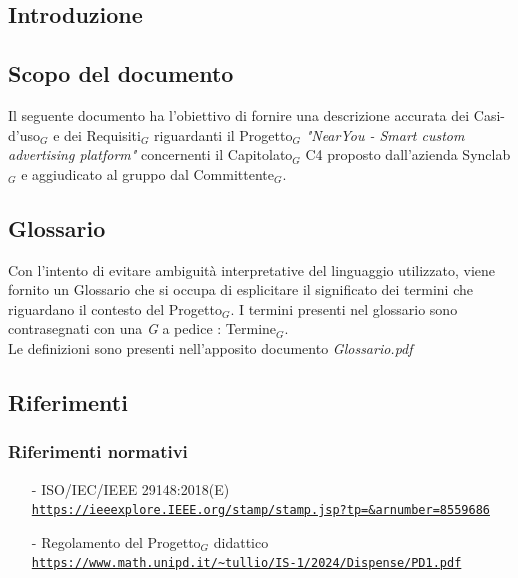 \documentclass[11pt]{article}
\begin{document}
\newpage
\tableofcontents
\newpage
\listoffigures
\newpage
\listoftables

\newpage
\begin{justify}

\section{Introduzione}
\label{sec:intro}

\subsection{Scopo del documento}

Il seguente documento ha l'obiettivo di fornire una descrizione accurata dei Casi-d'uso$_G$ e dei Requisiti$_G$ riguardanti il Progetto$_G$ \textit{"NearYou - 
Smart custom advertising platform"} concernenti il Capitolato$_G$ C4 proposto dall'azienda Synclab$_G$ e aggiudicato al gruppo dal Committente$_G$.


\subsection{Glossario}
Con l'intento di evitare ambiguità interpretative del linguaggio utilizzato, viene fornito un Glossario che si occupa di esplicitare il significato dei termini che riguardano il contesto del Progetto$_G$. I termini presenti nel glossario sono contrasegnati con una \textit{G} a pedice : Termine$_G$.\\
Le definizioni sono presenti nell'apposito documento \textit{Glossario.pdf}


\subsection{Riferimenti}

\subsubsection{Riferimenti normativi}
\begin{itemize}
    \item[-] ISO/IEC/IEEE 29148:2018(E) \\
    \textcolor{blue}{\texttt{\url{https://ieeexplore.IEEE.org/stamp/stamp.jsp?tp=&arnumber=8559686}}}
    
    \item[-] Regolamento del Progetto$_G$ didattico  \\
    \textcolor{blue}{\texttt{\url{https://www.math.unipd.it/~tullio/IS-1/2024/Dispense/PD1.pdf}}}
    

\end{itemize}
\end{justify}
\end{document}
